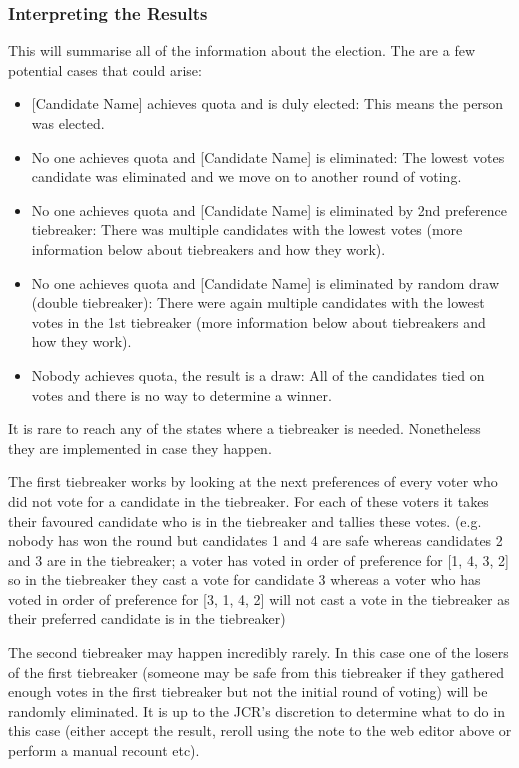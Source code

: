 \documentclass{article}
\begin{document}
\subsubsection{Interpreting the Results}
This will summarise all of the information about the election. The are a few potential cases that could arise:
\begin{itemize}
    \item {[Candidate Name]} achieves quota and is duly elected: This means the person was elected.
    \item No one achieves quota and [Candidate Name] is eliminated: The lowest votes candidate was eliminated and we move on to another round of voting.
    \item No one achieves quota and [Candidate Name] is eliminated by 2nd preference tiebreaker: There was multiple candidates with the lowest votes (more information below about tiebreakers and how they work).
    \item No one achieves quota and [Candidate Name] is eliminated by random draw (double tiebreaker): There were again multiple candidates with the lowest votes in the 1st tiebreaker (more information below about tiebreakers and how they work). 
    \item Nobody achieves quota, the result is a draw: All of the candidates tied on votes and there is no way to determine a winner.
\end{itemize}
It is rare to reach any of the states where a tiebreaker is needed. Nonetheless they are implemented in case they happen. 

The first tiebreaker works by looking at the next preferences of every voter who did not vote for a candidate in the tiebreaker. For each of these voters it takes their favoured candidate who is in the tiebreaker and tallies these votes. (e.g. nobody has won the round but candidates 1 and 4 are safe whereas candidates 2 and 3 are in the tiebreaker; a voter has voted in order of preference for [1, 4, 3, 2] so in the tiebreaker they cast a vote for candidate 3 whereas a voter who has voted in order of preference for [3, 1, 4, 2] will not cast a vote in the tiebreaker as their preferred candidate is in the tiebreaker)

The second tiebreaker may happen incredibly rarely. In this case one of the losers of the first tiebreaker (someone may be safe from this tiebreaker if they gathered enough votes in the first tiebreaker but not the initial round of voting) will be randomly eliminated. It is up to the JCR's discretion to determine what to do in this case (either accept the result, reroll using the note to the web editor above or perform a manual recount etc).
\end{document}
